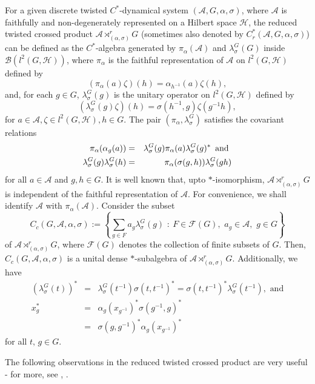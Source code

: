 \documentclass{amsart}
\numberwithin{equation}{section}
\newcommand{\mcal}{\mathcal}
\newcommand{\1}{\mathbf{1}}
\newcommand{\mA}{\mathcal{A}}
\begin{document}
For a given discrete twisted $C^*$-dynamical system
$(\mA,G,\alpha,\sigma)$, where $\mA$ is faithfully and
non-degenerately represented on a Hilbert space $\mcal{H}$, the
reduced twisted crossed product $\mA \rtimes^{r}_{(\alpha,\sigma)} G$
(sometimes also denoted by $C^{*}_{r}(\mA,G,\alpha, \sigma)$) can be
defined as the $C^*$-algebra generated by $\pi_{\alpha}(\mA)$ and
$\lambda_{\sigma}^G(G)$ inside $\mcal{B}(l^2(G,\mcal{H}))$, where
$\pi_{\alpha}$ is the faithful representation of $\mA$ on
$l^2(G,\mcal{H})$ defined by
\[
(\pi_{\alpha}(a)\zeta)(h)=\alpha_{h^{-1}}(a)\zeta(h),
\]
and, for each $g\in G$, $\lambda^{G}_{\sigma}(g)$ is the unitary
operator on $l^2(G,\mcal{H})$ defined by
\[
(\lambda^{G}_{\sigma}(g)\zeta)(h)= \sigma(h^{-1},g)\zeta(g^{-1}h),
\]
for $ a\in \mA, \zeta\in l^2(G,\mcal{H}), h\in G$. The pair
$(\pi_{\alpha},\lambda^{G}_{\sigma})$ satisfies the
covariant relations
\begin{eqnarray*}
\pi_{\alpha}(\alpha_{g}(a)) & = &
\lambda^{G}_{\sigma}(g)\pi_{\alpha}(a)\lambda^{G}_{\sigma}(g)^{*}
\text{\, and }\\ \lambda^{G}_{\sigma}(g)\lambda^{G}_{\sigma}(h) & = &
\pi_{\alpha}(\sigma(g,h))\lambda^{G}_{\sigma}(gh)
\end{eqnarray*}
for all $a\in \mA$ and $g,h\in G$. It is well known that, upto
$*$-isomorphism, $\mA \rtimes^{r}_{(\alpha,\sigma)} G$ is independent
of the faithful representation of $\mA$. For convenience, we shall
identify $\mA$ with $\pi_{\alpha}(\mA)$. Consider the subset
\[
C_{c}(G,\mA,\alpha,\sigma):=
\left\{\sum_{g \in F}a_{g}\lambda^{G}_{\sigma}(g)\,\,: \ F \in \mcal{F}(G),\,\,a_{g}\in
\mA, \,\, g\in G\right\}
\]
of $\mA \rtimes^{r}_{(\alpha,\sigma)}G$, where $\mcal{F}(G)$ denotes
the collection of finite subsets of $G$. Then,
$C_{c}(G,\mA,\alpha,\sigma)$ is a unital dense $*$-subalgebra of $\mA
\rtimes^{r}_{(\alpha,\sigma)}G$. Additionally, we have
\begin{eqnarray*}
(\lambda^{G}_{\sigma}(t))^* &=&
  \lambda^{G}_{\sigma}(t^{-1})\sigma(t,t^{-1})^*=
  \sigma(t,t^{-1})^*\lambda^{G}_{\sigma}(t^{-1}),\,\,\text{and}\\ x^{*}_{g}
  &=& \alpha_{g}(x_{g^{-1}})^{*}\sigma(g^{-1},g)^{*}\\ &=&
  \sigma(g,g^{-1})^{*} \alpha_{g}(x_{g^{-1}})^{*}
\end{eqnarray*}
 for all $t,\,g\in G.$

The following observations in the reduced twisted crossed product are
very useful - for more, see \cite{BG}, \cite{B}.
   
\end{document}
